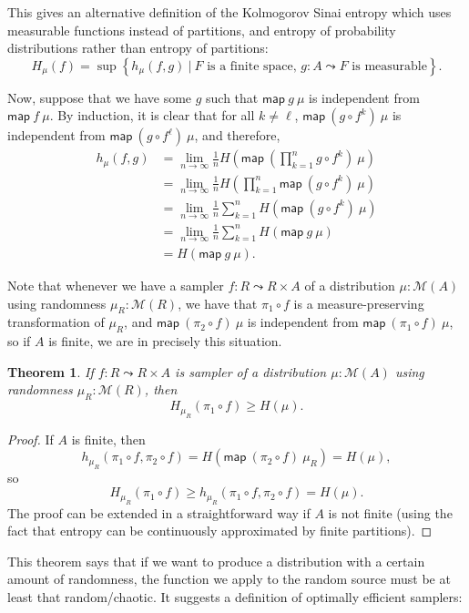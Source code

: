 \documentclass{article}           %
\newtheorem{theorem}{Theorem}
\newcommand{\map}[2]{\mathsf{map}\ {#1}\ {#2}}
\newcommand{\suchthat}{\ |\ }
\newcommand{\Dist}[1]{\mathcal{M}({#1})}
\begin{document}
This gives an alternative definition of the Kolmogorov Sinai entropy which uses measurable functions instead of partitions, and entropy of probability distributions rather than entropy of partitions:
\[
H_\mu(f) = \sup \left\{ h_\mu(f, g) \suchthat \text{$F$ is a finite space, $g : A \leadsto F$ is measurable} \right\}.
\]

Now, suppose that we have some $g$ such that $\map{g}{\mu}$ is independent from $\map{f}{\mu}$. By induction, it is clear that for all $k \ne \ell$, $\map{(g \circ f^k)}{\mu}$ is independent from $\map{(g \circ f^\ell)}{\mu}$, and therefore,
\begin{align*}
h_\mu(f, g) 
&= \lim_{n \to \infty} \frac{1}{n} H\left( \map{\left(\prod_{k = 1}^n g \circ f^k\right)} \mu \right)
\\ &= \lim_{n \to \infty} \frac{1}{n} H\left( \prod_{k = 1}^n \map{(g \circ f^k)}{\mu} \right)
\\ &= \lim_{n \to \infty} \frac{1}{n} \sum_{k = 1}^n H\left( \map{(g \circ f^k)}{\mu} \right)
\\ &= \lim_{n \to \infty} \frac{1}{n} \sum_{k = 1}^n H\left( \map{g}{\mu} \right)
\\ &= H(\map{g}{\mu}).
\end{align*}

Note that whenever we have a sampler $f : R \leadsto R \times A$ of a distribution $\mu : \Dist{A}$ using randomness $\mu_R : \Dist{R}$, we have that $\pi_1 \circ f$ is a measure-preserving transformation of $\mu_R$, and $\map{(\pi_2 \circ f)}{\mu}$ is independent from $\map{(\pi_1 \circ f)}{\mu}$, so if $A$ is finite, we are in precisely this situation.
\begin{theorem}
If $f : R \leadsto R \times A$ is sampler of a distribution $\mu : \Dist{A}$ using randomness $\mu_R : \Dist{R}$, then
\[
H_{\mu_R}(\pi_1 \circ f) \ge H(\mu).
\]
\end{theorem}
\begin{proof}
If $A$ is finite, then 
\[
h_{\mu_R}(\pi_1 \circ f, \pi_2 \circ f) = H(\map{(\pi_2 \circ f)}{\mu_R}) = H(\mu),
\]
so
\[
H_{\mu_R}(\pi_1 \circ f) \ge h_{\mu_R}(\pi_1 \circ f, \pi_2 \circ f) = H(\mu).
\]
The proof can be extended in a straightforward way if $A$ is not finite (using the fact that entropy can be continuously approximated by finite partitions).
\end{proof}

This theorem says that if we want to produce a distribution with a certain amount of randomness, the function we apply to the random source must be at least that random/chaotic. It suggests a definition of optimally efficient samplers:
\end{document}
